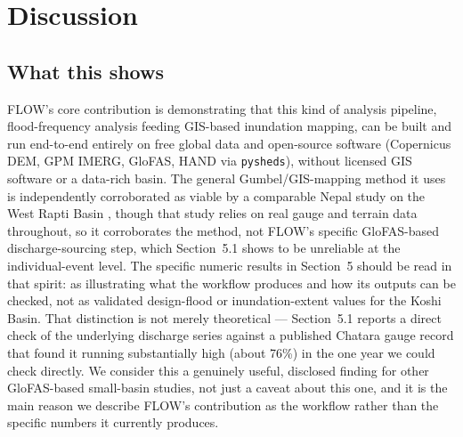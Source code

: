 \documentclass[11pt]{article}
\begin{document}
\section{Discussion}

\subsection{What this shows}

FLOW's core contribution is demonstrating that this kind of analysis pipeline, flood-frequency analysis feeding GIS-based inundation mapping, can be built and run end-to-end entirely on free global data and open-source software (Copernicus DEM, GPM IMERG, GloFAS, HAND via \texttt{pysheds}), without licensed GIS software or a data-rich basin. The general Gumbel/GIS-mapping method it uses is independently corroborated as viable by a comparable Nepal study on the West Rapti Basin \citep{sharma2025westrapti}, though that study relies on real gauge and terrain data throughout, so it corroborates the method, not FLOW's specific GloFAS-based discharge-sourcing step, which Section~5.1 shows to be unreliable at the individual-event level. The specific numeric results in Section~5 should be read in that spirit: as illustrating what the workflow produces and how its outputs can be checked, not as validated design-flood or inundation-extent values for the Koshi Basin. That distinction is not merely theoretical --- Section~5.1 reports a direct check of the underlying discharge series against a published Chatara gauge record that found it running substantially high (about 76\%) in the one year we could check directly. We consider this a genuinely useful, disclosed finding for other GloFAS-based small-basin studies, not just a caveat about this one, and it is the main reason we describe FLOW's contribution as the workflow rather than the specific numbers it currently produces.
\end{document}
